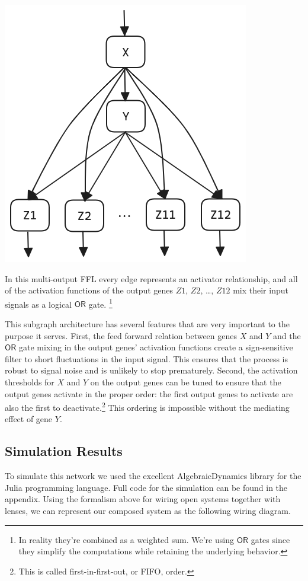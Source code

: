 \documentclass[12pt]{article}
\begin{document}
\begin{center}
    \includegraphics*[scale=0.35]{multioutput_FFL.png}
\end{center}

In this multi-output FFL every edge represents an activator relationship, and all of the activation functions of the output genes $Z1$, $Z2$, \dots, $Z12$ mix their input signals as a logical $\mathsf{OR}$ gate.
\footnote{In reality they're combined as a weighted sum. We're using $\mathsf{OR}$ gates since they simplify the computations while retaining the underlying behavior.}

This subgraph architecture has several features that are very important to the purpose it serves.
First, the feed forward relation between genes $X$ and $Y$ and the $\mathsf{OR}$ gate mixing in the output genes' activation functions create a sign-sensitive filter to short fluctuations in the input signal.
This ensures that the process is robust to signal noise and is unlikely to stop prematurely.
Second, the activation thresholds for $X$ and $Y$ on the output genes can be tuned to ensure that the output genes activate in the proper order: the first output genes to activate are also the first to deactivate.\footnote{This is called first-in-first-out, or FIFO, order.}
This ordering is impossible without the mediating effect of gene $Y$.


\subsection*{Simulation Results}
To simulate this network we used the excellent AlgebraicDynamics library for the Julia programming language.
Full code for the simulation can be found in the appendix.
Using the formalism above for wiring open systems together with lenses, we can represent our composed system as the following wiring diagram.
\end{document}
